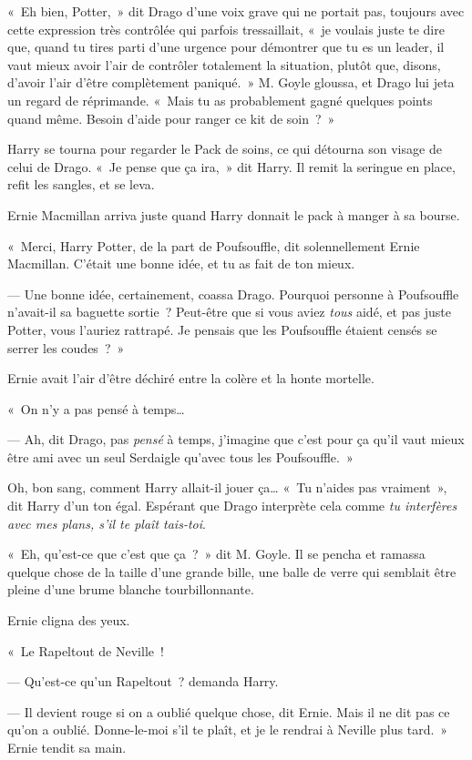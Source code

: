 «~Eh bien, Potter,~» dit Drago d'une voix grave qui ne portait pas, toujours avec cette expression très contrôlée qui parfois tressaillait, «~je voulais juste te dire que, quand tu tires parti d'une urgence pour démontrer que tu es un leader, il vaut mieux avoir l'air de contrôler totalement la situation, plutôt que, disons, d'avoir l'air d'être complètement paniqué.~» M. Goyle gloussa, et Drago lui jeta un regard de réprimande. «~Mais tu as probablement gagné quelques points quand même. Besoin d'aide pour ranger ce kit de soin~?~»

Harry se tourna pour regarder le Pack de soins, ce qui détourna son visage de celui de Drago. «~Je pense que ça ira,~» dit Harry. Il remit la seringue en place, refit les sangles, et se leva.

Ernie Macmillan arriva juste quand Harry donnait le pack à manger à sa bourse.

«~Merci, Harry Potter, de la part de Poufsouffle, dit solennellement Ernie Macmillan. C'était une bonne idée, et tu as fait de ton mieux.

--- Une bonne idée, certainement, coassa Drago. Pourquoi personne à Poufsouffle n'avait-il sa baguette sortie~? Peut-être que si vous aviez \emph{tous} aidé, et pas juste Potter, vous l'auriez rattrapé. Je pensais que les Poufsouffle étaient censés se serrer les coudes~?~»

Ernie avait l'air d'être déchiré entre la colère et la honte mortelle.

«~On n'y a pas pensé à temps…

--- Ah, dit Drago, pas \emph{pensé} à temps, j'imagine que c'est pour ça qu'il vaut mieux être ami avec un seul Serdaigle qu'avec tous les Poufsouffle.~»

Oh, bon sang, comment Harry allait-il jouer ça… «~Tu n'aides pas vraiment~», dit Harry d'un ton égal. Espérant que Drago interprète cela comme \emph{tu interfères avec mes plans, s'il te plaît tais-toi}.

«~Eh, qu'est-ce que c'est que ça~?~» dit M. Goyle. Il se pencha et ramassa quelque chose de la taille d'une grande bille, une balle de verre qui semblait être pleine d'une brume blanche tourbillonnante.

Ernie cligna des yeux.

«~Le Rapeltout de Neville~!

--- Qu'est-ce qu'un Rapeltout~? demanda Harry.

--- Il devient rouge si on a oublié quelque chose, dit Ernie. Mais il ne dit pas ce qu'on a oublié. Donne-le-moi s'il te plaît, et je le rendrai à Neville plus tard.~» Ernie tendit sa main.

